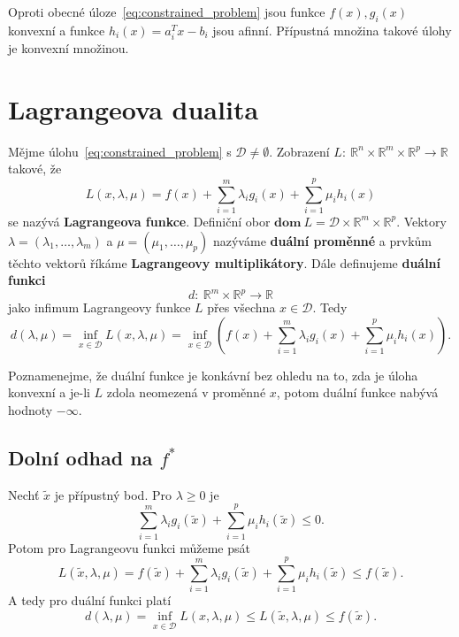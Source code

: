 Oproti obecné úloze~\ref{eq:constrained_problem} jsou funkce $f(x), g_i(x)$ konvexní a funkce $h_i(x) = a_i^Tx - b_i$ jsou afinní. Přípustná množina takové úlohy je konvexní množinou.

\section{Lagrangeova dualita}

Mějme úlohu~\ref{eq:constrained_problem} s $\mathcal{D} \neq \emptyset$. Zobrazení $L:\ \mathbb{R}^n \times \mathbb{R}^m \times \mathbb{R}^p \rightarrow \mathbb{R}$ takové, že
\begin{equation}
    L(x, \lambda, \mu) = f(x) + \sum_{i=1}^m \lambda_i g_i(x) + \sum_{i=1}^p \mu_i h_i(x)
\end{equation}
se nazývá \textbf{Lagrangeova funkce}. Definiční obor $\textbf{dom}\ L = \mathcal{D} \times \mathbb{R}^m \times \mathbb{R}^p$. Vektory $\lambda = (\lambda_1, \dots, \lambda_m)$ a $\mu = (\mu_1, \dots, \mu_p)$ nazýváme \textbf{duální proměnné} a prvkům těchto vektorů říkáme \textbf{Lagrangeovy multiplikátory}. Dále definujeme \textbf{duální funkci}
$$
    d:\ \mathbb{R}^m \times \mathbb{R}^p \rightarrow \mathbb{R}
$$
jako infimum Lagrangeovy funkce $L$ přes všechna $x \in \mathcal{D}$. Tedy
\begin{equation}
    d(\lambda, \mu) = \inf_{x \in \mathcal{D}} L(x, \lambda, \mu) = \inf_{x \in \mathcal{D}} \left( f(x) + \sum_{i=1}^m \lambda_i g_i(x) + \sum_{i=1}^p \mu_i h_i(x) \right).
\end{equation}

Poznamenejme, že duální funkce je konkávní bez ohledu na to, zda je úloha konvexní a je-li $L$ zdola neomezená v proměnné $x$, potom duální funkce nabývá hodnoty $-\infty$.

\subsection*{Dolní odhad na $f^*$}\label{s:lower_bound}

Nechť $\tilde{x}$ je přípustný bod. Pro $\lambda \geq 0$ je
$$
    \sum_{i=1}^m \lambda_i g_i(\tilde{x}) + \sum_{i=1}^p \mu_i h_i(\tilde{x}) \leq 0.
$$
Potom pro Lagrangeovu funkci můžeme psát
$$
    L(\tilde{x}, \lambda, \mu) = f(\tilde{x}) + \sum_{i=1}^m \lambda_i g_i(\tilde{x}) + \sum_{i=1}^p \mu_i h_i(\tilde{x}) \leq f(\tilde{x}).
$$
A tedy pro duální funkci platí
$$
    d(\lambda, \mu) = \inf_{x \in \mathcal{D}} L(x, \lambda, \mu) \leq L(\tilde{x}, \lambda, \mu) \leq f(\tilde{x}).
$$

